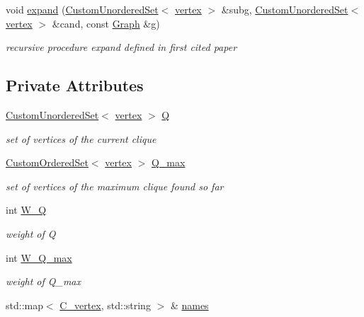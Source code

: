 \begin{DoxyCompactItemize}
void \hyperlink{classTTT__maximal__weighted__clique__fast_afa776883f9aeaca8194a842c8b333fc4}{expand} (\hyperlink{classCustomUnorderedSet}{Custom\+Unordered\+Set}$<$ \hyperlink{classTTT__maximal__weighted__clique__fast_a55ca1f8931415f7338827925b86c218d}{vertex} $>$ \&subg, \hyperlink{classCustomUnorderedSet}{Custom\+Unordered\+Set}$<$ \hyperlink{classTTT__maximal__weighted__clique__fast_a55ca1f8931415f7338827925b86c218d}{vertex} $>$ \&cand, const \hyperlink{structGraph}{Graph} \&g)
\begin{DoxyCompactList}\small\item\em recursive procedure expand defined in first cited paper \end{DoxyCompactList}\end{DoxyCompactItemize}
\subsection*{Private Attributes}
\begin{DoxyCompactItemize}
\item 
\hyperlink{classCustomUnorderedSet}{Custom\+Unordered\+Set}$<$ \hyperlink{classTTT__maximal__weighted__clique__fast_a55ca1f8931415f7338827925b86c218d}{vertex} $>$ \hyperlink{classTTT__maximal__weighted__clique__fast_a88fdb331d74898bd24f3a0c18ac7ed6d}{Q}
\begin{DoxyCompactList}\small\item\em set of vertices of the current clique \end{DoxyCompactList}\item 
\hyperlink{classCustomOrderedSet}{Custom\+Ordered\+Set}$<$ \hyperlink{classTTT__maximal__weighted__clique__fast_a55ca1f8931415f7338827925b86c218d}{vertex} $>$ \hyperlink{classTTT__maximal__weighted__clique__fast_ab721403471abde42379115e117b9e334}{Q\+\_\+max}
\begin{DoxyCompactList}\small\item\em set of vertices of the maximum clique found so far \end{DoxyCompactList}\item 
int \hyperlink{classTTT__maximal__weighted__clique__fast_a1f990403b10caa438cf387b38b3988a0}{W\+\_\+Q}
\begin{DoxyCompactList}\small\item\em weight of Q \end{DoxyCompactList}\item 
int \hyperlink{classTTT__maximal__weighted__clique__fast_a3d82b95e1649b6576ef96cc5b2286835}{W\+\_\+\+Q\+\_\+max}
\begin{DoxyCompactList}\small\item\em weight of Q\+\_\+max \end{DoxyCompactList}\item 
std\+::map$<$ \hyperlink{clique__covering__graph_8hpp_a9cb45047ea8c5ed95a8cfa90494345aa}{C\+\_\+vertex}, std\+::string $>$ \& \hyperlink{classTTT__maximal__weighted__clique__fast_a8a28c9efad9dfb4eba9948cfc9f34ff0}{names}
\end{DoxyCompactItemize}


